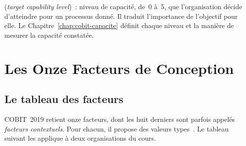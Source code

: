 \begin{boxdef}
(\textit{target capability level})~: niveau de capacité, de~0 à~5, que
l'organisation décide d'atteindre pour un processus donné. Il traduit
l'importance de l'objectif pour elle. Le Chapitre~\ref{chap:cobit-capacite}
définit chaque niveau et la manière de mesurer la capacité constatée.
\end{boxdef}

\section{Les Onze Facteurs de Conception}
\label{sec:c07-facteurs}

\subsection{Le tableau des facteurs}

COBIT~2019 retient onze facteurs, dont les huit derniers sont parfois
appelés \emph{facteurs contextuels}. Pour chacun, il propose des valeurs
types~\cite{isaca2018cobitintro}. Le tableau suivant les applique à deux
organisations du cours.

